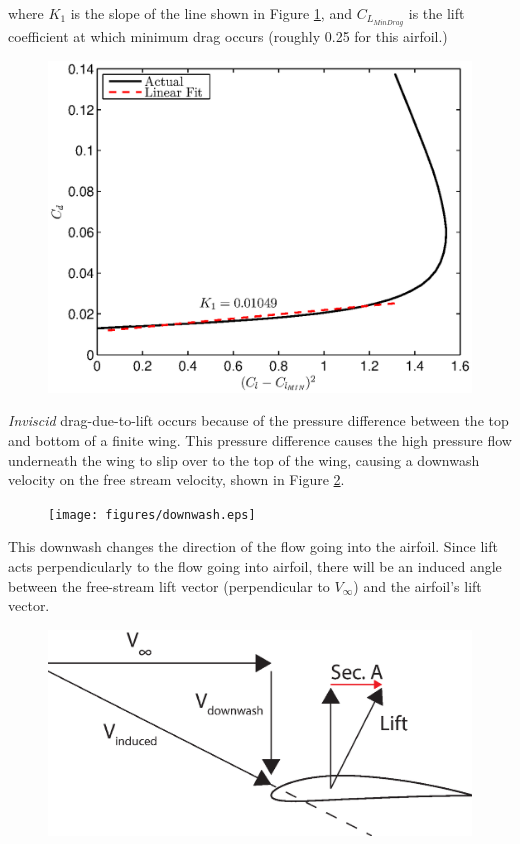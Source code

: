 where $K_1$ is the slope of the line shown in Figure \ref{naca4412cdmin}, and $C_{L_{MinDrag}}$ is the lift coefficient at which minimum drag occurs (roughly 0.25 for this airfoil.)

\begin{figure}[h!]
  \centering
  \includegraphics[width=.6\linewidth]{figures/naca4412cdmin.eps}
  \label{naca4412cdmin}
\end{figure}
\textit{Inviscid} drag-due-to-lift occurs because of the pressure difference between the top and bottom of a finite wing. This pressure difference causes the high pressure flow underneath the wing to slip over to the top of the wing, causing a downwash velocity on the free stream velocity, shown in Figure \ref{downwash}.
\begin{figure}[H]
  \centering
  \texttt{[image: figures/downwash.eps]}
  \label{downwash}
\end{figure}

This downwash changes the direction of the flow going into the airfoil. Since lift acts perpendicularly to the flow going into airfoil, there will be an induced angle between the free-stream lift vector (perpendicular to $V_\infty$) and the airfoil's lift vector.

\begin{figure}[H]
  \centering
  \includegraphics[width=.6\linewidth]{figures/inducedDrag.eps}
  \label{inducedDrag}
\end{figure}

